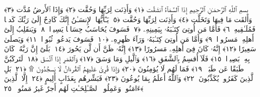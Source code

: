 
  
    
  
    
    

\nopagebreak
  بِسمِ ٱللَّهِ ٱلرَّحمَـٰنِ ٱلرَّحِيمِ
  إِذَا ٱلسَّمَآءُ ٱنشَقَّت ﴿١﴾
 وَأَذِنَت لِرَبِّهَا وَحُقَّت ﴿٢﴾
 وَإِذَا ٱلأَرضُ مُدَّت ﴿٣﴾
 وَأَلقَت مَا فِيهَا وَتَخَلَّت ﴿٤﴾
 وَأَذِنَت لِرَبِّهَا وَحُقَّت ﴿٥﴾
 يَـٰٓأَيُّهَا ٱلإِنسَـٰنُ إِنَّكَ كَادِحٌ إِلَىٰ رَبِّكَ كَدحًۭا فَمُلَـٰقِيهِ ﴿٦﴾
 فَأَمَّا مَن أُوتِىَ كِتَـٰبَهُۥ بِيَمِينِهِۦ ﴿٧﴾
 فَسَوفَ يُحَاسَبُ حِسَابًۭا يَسِيرًۭا ﴿٨﴾
 وَيَنقَلِبُ إِلَىٰٓ أَهلِهِۦ مَسرُورًۭا ﴿٩﴾
 وَأَمَّا مَن أُوتِىَ كِتَـٰبَهُۥ وَرَآءَ ظَهرِهِۦ ﴿١٠﴾
 فَسَوفَ يَدعُوا۟ ثُبُورًۭا ﴿١١﴾
 وَيَصلَىٰ سَعِيرًا ﴿١٢﴾
 إِنَّهُۥ كَانَ فِىٓ أَهلِهِۦ مَسرُورًا ﴿١٣﴾
 إِنَّهُۥ ظَنَّ أَن لَّن يَحُورَ ﴿١٤﴾
 بَلَىٰٓ إِنَّ رَبَّهُۥ كَانَ بِهِۦ بَصِيرًۭا ﴿١٥﴾
 فَلَآ أُقسِمُ بِٱلشَّفَقِ ﴿١٦﴾
 وَٱلَّيلِ وَمَا وَسَقَ ﴿١٧﴾
 وَٱلقَمَرِ إِذَا ٱتَّسَقَ ﴿١٨﴾
 لَتَركَبُنَّ طَبَقًا عَن طَبَقٍۢ ﴿١٩﴾
 فَمَا لَهُم لَا يُؤمِنُونَ ﴿٢٠﴾
 وَإِذَا قُرِئَ عَلَيهِمُ ٱلقُرءَانُ لَا يَسجُدُونَ ۩ ﴿٢١﴾
 بَلِ ٱلَّذِينَ كَفَرُوا۟ يُكَذِّبُونَ ﴿٢٢﴾
 وَٱللَّهُ أَعلَمُ بِمَا يُوعُونَ ﴿٢٣﴾
 فَبَشِّرهُم بِعَذَابٍ أَلِيمٍ ﴿٢٤﴾
 إِلَّا ٱلَّذِينَ ءَامَنُوا۟ وَعَمِلُوا۟ ٱلصَّـٰلِحَـٰتِ لَهُم أَجرٌ غَيرُ مَمنُونٍۭ ﴿٢٥﴾
 
